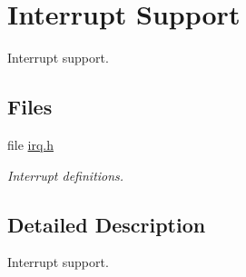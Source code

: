 \hypertarget{group__lm3s69xx__interrupt}{}\section{Interrupt Support}
\label{group__lm3s69xx__interrupt}


Interrupt support.  


\subsection*{Files}
\begin{DoxyCompactItemize}
\item 
file \mbox{\hyperlink{bsps_2arm_2lm3s69xx_2include_2bsp_2irq_8h}{irq.\+h}}
\begin{DoxyCompactList}\small\item\em Interrupt definitions. \end{DoxyCompactList}\end{DoxyCompactItemize}


\subsection{Detailed Description}
Interrupt support. 

